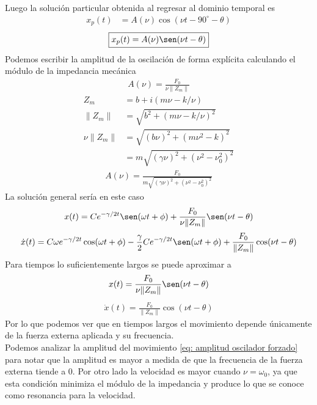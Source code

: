 \documentclass[12pt]{article}
\begin{document}
Luego la solución particular obtenida al regresar al dominio temporal es
\begin{align*}
    x_p(t) &= A(\nu) \cos(\nu t - 90^{\circ} - \theta) 
\end{align*}
\begin{align*}
    \boxed{x_p(t)= A(\nu) \sen(\nu t - \theta)}
\end{align*}
Podemos escribir la amplitud de la oscilación de forma explícita calculando el módulo de la impedancia mecánica
\begin{align*}
    A(\nu ) = \frac{F_0 }{\nu \|Z_m\|}
\end{align*}
\begin{align*}
    Z_m & = b + i(m\nu - k/\nu)\\
    \|Z_m\|&= \sqrt{b^{2} +(m\nu - k/\nu)^{2} }\\
    \nu \|Z_m\|&= \sqrt{(b\nu)^{2} +(m\nu^{2} - k)^{2} }\\
    &=  m \sqrt{\left(\gamma \nu\right)^{2} + \left(\nu^{2} - \nu_0^{2}\right)^{2} }
\end{align*}
\begin{align}
    A(\nu) = \frac{F_0}{m \sqrt{\left(\gamma \nu\right)^{2} + \left(\nu^{2} - \nu_0^{2}\right)^{2} }} \label{eq: amplitud oscilador forzado}
\end{align}
La solución general sería en este caso
\begin{align*}
    x(t) = C e^{-\gamma/2 t} \sen(\omega t + \phi) + \frac{F_0}{\nu\|Z_m\|} \sen(\nu t - \theta)
\end{align*}
\begin{align*}
    \dot{x}(t) = C\omega e^{-\gamma/2 t} \cos(\omega t + \phi)-\frac{\gamma }{2}C e^{-\gamma/2 t} \sen(\omega t + \phi) + \frac{F_0}{\|Z_m\|} \cos(\nu t - \theta)
\end{align*}
Para tiempos lo suficientemente largos se puede aproximar a 
\begin{align*}
    x(t) = \frac{F_0}{\nu\|Z_m\|} \sen(\nu t - \theta)
\end{align*}
\begin{align*}
      \dot{x}(t) = \frac{F_0}{\|Z_m\|} \cos(\nu t - \theta)
\end{align*}
Por lo que podemos ver que en tiempos largos el movimiento depende únicamente de la fuerza externa aplicada y su frecuencia.\\

Podemos analizar la amplitud del movimiento \eqref{eq: amplitud oscilador forzado} para notar que la amplitud es mayor a medida de que la frecuencia de la fuerza externa tiende a 0. Por otro lado la velocidad es mayor cuando \( \nu = \omega_0\), ya que esta condición minimiza el módulo de la impedancia y produce lo que se conoce como resonancia para la velocidad.\\
\end{document}
